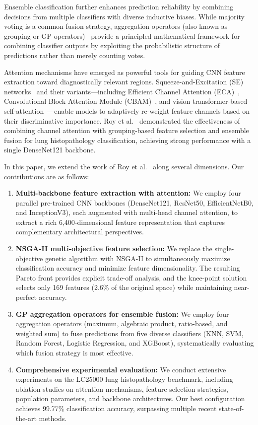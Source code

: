 \documentclass{article}
\begin{document}
Ensemble classification further enhances prediction reliability by combining decisions from multiple classifiers with diverse inductive biases. While majority voting is a common fusion strategy, aggregation operators (also known as grouping or GP operators)~\cite{beliakov2007aggregation} provide a principled mathematical framework for combining classifier outputs by exploiting the probabilistic structure of predictions rather than merely counting votes.

Attention mechanisms have emerged as powerful tools for guiding CNN feature extraction toward diagnostically relevant regions. Squeeze-and-Excitation (SE) networks~\cite{hu2018squeeze} and their variants---including Efficient Channel Attention (ECA)~\cite{wang2020eca}, Convolutional Block Attention Module (CBAM)~\cite{woo2018cbam}, and vision transformer-based self-attention~\cite{dosovitskiy2020image}---enable models to adaptively re-weight feature channels based on their discriminative importance. Roy et al.~\cite{roy2025grouping} demonstrated the effectiveness of combining channel attention with grouping-based feature selection and ensemble fusion for lung histopathology classification, achieving strong performance with a single DenseNet121 backbone.

In this paper, we extend the work of Roy et al.~\cite{roy2025grouping} along several dimensions. Our contributions are as follows:

\begin{enumerate}
	\item \textbf{Multi-backbone feature extraction with attention:} We employ four parallel pre-trained CNN backbones (DenseNet121, ResNet50, EfficientNetB0, and InceptionV3), each augmented with multi-head channel attention, to extract a rich 6,400-dimensional feature representation that captures complementary architectural perspectives.

	\item \textbf{NSGA-II multi-objective feature selection:} We replace the single-objective genetic algorithm with NSGA-II to simultaneously maximize classification accuracy and minimize feature dimensionality. The resulting Pareto front provides explicit trade-off analysis, and the knee-point solution selects only 169 features (2.6\% of the original space) while maintaining near-perfect accuracy.

	\item \textbf{GP aggregation operators for ensemble fusion:} We employ four aggregation operators (maximum, algebraic product, ratio-based, and weighted sum) to fuse predictions from five diverse classifiers (KNN, SVM, Random Forest, Logistic Regression, and XGBoost), systematically evaluating which fusion strategy is most effective.

	\item \textbf{Comprehensive experimental evaluation:} We conduct extensive experiments on the LC25000 lung histopathology benchmark, including ablation studies on attention mechanisms, feature selection strategies, population parameters, and backbone architectures. Our best configuration achieves 99.77\% classification accuracy, surpassing multiple recent state-of-the-art methods.
\end{enumerate}
\end{document}
